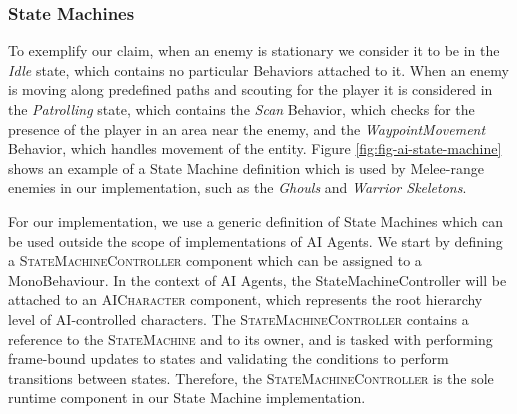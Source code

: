 \subsubsection{State Machines}

To exemplify our claim, when an enemy is stationary we consider it to be in the \emph{Idle} state, which contains no particular Behaviors attached to it. When an enemy is moving along predefined paths and scouting for the player it is considered in the \emph{Patrolling} state, which contains the \emph{Scan} Behavior, which checks for the presence of the player in an area near the enemy, and the \emph{WaypointMovement} Behavior, which handles movement of the entity. Figure \ref{fig:fig-ai-state-machine} shows an example of a State Machine definition which is used by Melee-range enemies in our implementation, such as the \emph{Ghouls} and \emph{Warrior Skeletons}.



For our implementation, we use a generic definition of State Machines which can be used outside the scope of implementations of AI Agents. We start by defining a \textsc{StateMachineController} component which can be assigned to a MonoBehaviour. In the context of AI Agents, the StateMachineController will be attached to an \textsc{AICharacter} component, which represents the root hierarchy level of AI-controlled characters. The \textsc{StateMachineController} contains a reference to the \textsc{StateMachine} and to its owner, and is tasked with performing frame-bound updates to states and validating the conditions to perform transitions between states. Therefore, the \textsc{StateMachineController} is the sole runtime component in our State Machine implementation.

